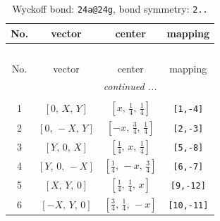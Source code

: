 \documentclass[fleqn,8pt]{jsarticle}
\begin{document}
\begin{longtable}{cccc}
\caption{Wyckoff bond: {\tt 24a@24g}, bond symmetry: {\tt 2..}}
 \\
 \hline \hline
No. & vector & center & mapping \\ \hline \endfirsthead

\multicolumn{3}{l}{\tablename\ \thetable{}} \\
 \hline \hline
No. & vector & center & mapping \\ \hline \endhead

 \hline \hline
\multicolumn{3}{r}{\footnotesize\it continued ...} \\ \endfoot

 \hline \hline
\multicolumn{3}{r}{} \\ \endlastfoot

1 & $\left[ 0,\, X,\, Y \right]$ & $\left[ x,\, \frac{1}{4},\, \frac{1}{4} \right]$ & {\tt [1,-4]} \\ \hline
2 & $\left[ 0,\, - X,\, Y \right]$ & $\left[ - x,\, \frac{3}{4},\, \frac{1}{4} \right]$ & {\tt [2,-3]} \\ \hline
3 & $\left[ Y,\, 0,\, X \right]$ & $\left[ \frac{1}{4},\, x,\, \frac{1}{4} \right]$ & {\tt [5,-8]} \\ \hline
4 & $\left[ Y,\, 0,\, - X \right]$ & $\left[ \frac{1}{4},\, - x,\, \frac{3}{4} \right]$ & {\tt [6,-7]} \\ \hline
5 & $\left[ X,\, Y,\, 0 \right]$ & $\left[ \frac{1}{4},\, \frac{1}{4},\, x \right]$ & {\tt [9,-12]} \\ \hline
6 & $\left[ - X,\, Y,\, 0 \right]$ & $\left[ \frac{3}{4},\, \frac{1}{4},\, - x \right]$ & {\tt [10,-11]} \\
\end{longtable}
\renewcommand{\arraystretch}{1.2}
\end{document}

